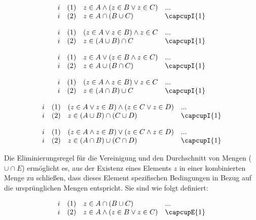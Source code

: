 \documentclass{book}
\theoremstyle{plain}
\theoremstyle{remark}
\theoremstyle{definition}
\begin{document}
\[
\begin{array}{llll}
	i & (1) & z \in A \land (z \in B \lor z \in C) & ... \\
	i & (2) & z \in A \cap (B \cup C) & \capcupI{1} \\
\end{array}
\]

\[
\begin{array}{llll}
	i & (1) &  (z \in A \lor z \in B)\land z\in C & ... \\
	i & (2) & z\in (A \cup B)\cap C & \capcupI{1} \\
\end{array}
\]

\[
\begin{array}{llll}
	i & (1) & z \in A \lor (z \in B \land z \in C) & ... \\
	i & (2) & z \in A \cup (B \cap C) & \capcupI{1} \\
\end{array}
\]

\[
\begin{array}{llll}
	i & (1) &  (z \in A \land z \in B)\lor z\in C & ... \\
	i & (2) & z\in (A \cap B)\cup C & \capcupI{1} \\
\end{array}
\]

\[
\begin{array}{llll}
	i & (1) & (z \in A \lor z \in B) \land (z \in C \lor z \in D) & ... \\
	i & (2) & z \in (A \cup B) \cap (C \cup D) & \capcupI{1} \\
\end{array}
\]

\[
\begin{array}{llll}
	i & (1) & (z \in A \land z \in B) \lor (z \in C \land z \in D) & ... \\
	i & (2) & z \in (A \cap B) \cup (C \cap D) & \capcupI{1} \\
\end{array}
\]

Die Eliminierungsregel für die Vereinigung und den Durchschnitt von Mengen (\(\cup\cap E\)) ermöglicht es, aus der Existenz eines Elements \( z \) in einer kombinierten Menge zu schließen, dass dieses Element spezifischen Bedingungen in Bezug auf die ursprünglichen Mengen entspricht. Sie sind wie folgt definiert:

\[
\begin{array}{llll}
	i & (1) & z \in A \cap (B \cup C) & ... \\
	i & (2) & z \in A \land (z \in B \lor z \in C) & \capcupE{1} \\
	
\end{array}
\]
\end{document}
